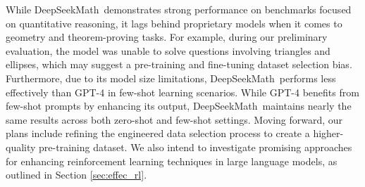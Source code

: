 While DeepSeekMath~demonstrates strong performance on benchmarks focused on quantitative reasoning, it lags behind proprietary models when it comes to geometry and theorem-proving tasks. For example, during our preliminary evaluation, the model was unable to solve questions involving triangles and ellipses, which may suggest a pre-training and fine-tuning dataset selection bias. Furthermore, due to its model size limitations, DeepSeekMath~performs less effectively than GPT-4 in few-shot learning scenarios. While GPT-4 benefits from few-shot prompts by enhancing its output, DeepSeekMath~maintains nearly the same results across both zero-shot and few-shot settings. Moving forward, our plans include refining the engineered data selection process to create a higher-quality pre-training dataset. We also intend to investigate promising approaches for enhancing reinforcement learning techniques in large language models, as outlined in Section \ref{sec:effec_rl}.

